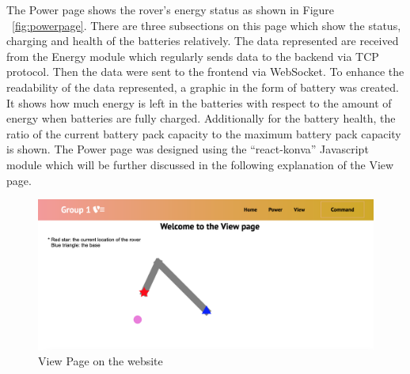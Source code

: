 \documentclass[a4paper]{article}
\begin{document}
The Power page shows the rover’s energy status as shown in Figure ~\ref{fig:powerpage}. There are three subsections on this 
page which show the status, charging and health of the batteries relatively. The data represented are received 
from the Energy module which regularly sends data to the backend via TCP protocol. Then the data were sent to 
the frontend via WebSocket.\cite{WebSocketAPI} To enhance the readability of the data represented, a graphic 
in the form of battery was created. It shows how much energy is left in the batteries with respect to the amount 
of energy when batteries are fully charged. Additionally for the battery health, the ratio of the current battery 
pack capacity to the maximum battery pack capacity is shown. The Power page was designed using the “react-konva” 
Javascript module \cite{ReactKonva} which will be further discussed in the following explanation of the View page. 

\begin{figure}[H]
	\begin{Center}
		\includegraphics[width = \linewidth]{./images/ViewPage.png}
		\caption{View Page on the website}
        \label{fig:viewpage}
	\end{Center}
\end{figure}
\end{document}
